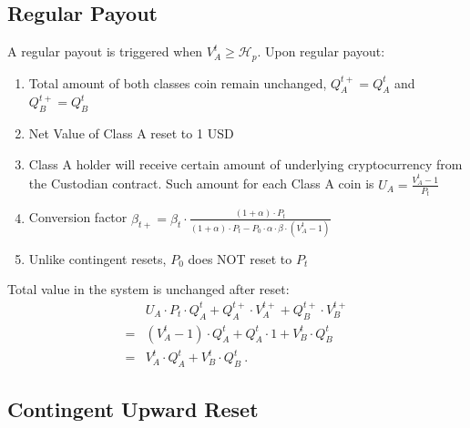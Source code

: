 \documentclass[final,pdftex]{ectaart}
\theoremstyle{plain}
\begin{document}
\begin{appendices}
\subsection{Regular Payout}\label{subsec:Periodic-Reset}

A regular payout is triggered when $V_{A}^{t}\geqslant\mathcal{H}_{p}$. Upon regular payout:
\begin{enumerate}
\item Total amount of both classes coin remain unchanged, $Q_{A}^{t+}=Q_{A}^{t}$ and $Q_{B}^{t+}=Q_{B}^{t}$
\item Net Value of Class A reset to 1 USD
\item Class A holder will receive certain amount of underlying cryptocurrency from the Custodian contract. Such amount for each Class A coin is $U_{A}=\frac{V_{A}^{t}-1}{P_{t}}$
\item Conversion factor $\beta_{t+}=\beta_t\cdot\frac{\left(1+\alpha\right)\cdot P_{t}}{\left(1+\alpha\right)\cdot P_{t}-P_{0}\cdot\alpha\cdot\beta\cdot\left(V_{A}^{t}-1\right)}$
\item Unlike contingent resets, $P_{0}$ does NOT reset to $P_{t}$
\end{enumerate}
Total value in the system is unchanged after reset:
\begin{align*}
 & U_{A}\cdot P_{t}\cdot Q_{A}^{t}+Q_{A}^{t+}\cdot V_{A}^{t+}+Q_{B}^{t+}\cdot V_{B}^{t+}\\
= & \left(V_{A}^{t}-1\right)\cdot Q_{A}^{t}+Q_{A}^{t}\cdot1+V_{B}^{t}\cdot Q_{B}^{t}\\
= & V_{A}^{t}\cdot Q_{A}^{t}+V_{B}^{t}\cdot Q_{B}^{t}\ .
\end{align*}



\subsection{Contingent Upward Reset\label{subsec:Contingent-Upward-Reset}}


\end{appendices}
\end{document}
